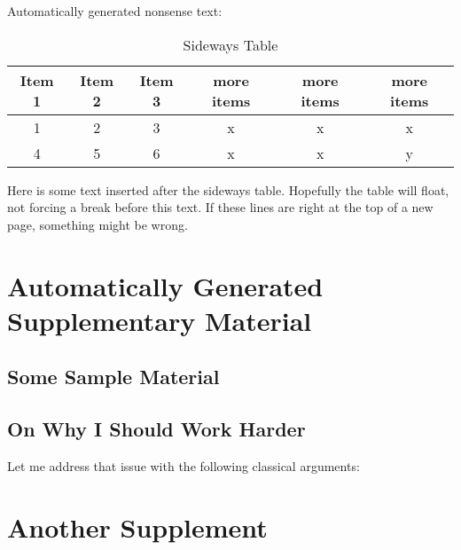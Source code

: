 \documentclass{csuthesis} %
\begin{document}
Automatically generated nonsense text: \lipsum[3-4]

\begin{sidewayspage}
\begin{table}[h]
\caption{Sideways Table \label{table:sidetable}}
\begin{tabular}{|c|c|c|ccc|}
\hline
Item 1 & Item 2 & Item 3 & more items & more items & more items\\
\hline
\hline
1 & 2 & 3 & x & x & x\\
4 & 5 & 6 & x & x & y\\
\hline
\end{tabular}
\end{table}
\end{sidewayspage}

Here is some text inserted after the sideways table.  Hopefully the table will float, not forcing a break before this text.  If these lines are right at the top of a new page, something might be wrong. \lipsum[1-3]

\backmatter
% 

\appendix %

\chapter{Automatically Generated Supplementary Material} %

\section{Some Sample Material}

\lipsum[5-7]

\section{On Why I Should Work Harder}

Let me address that issue with the following classical arguments: \lipsum[1-2]

\chapter{Another Supplement}

\lipsum[1-3]
\end{document}
